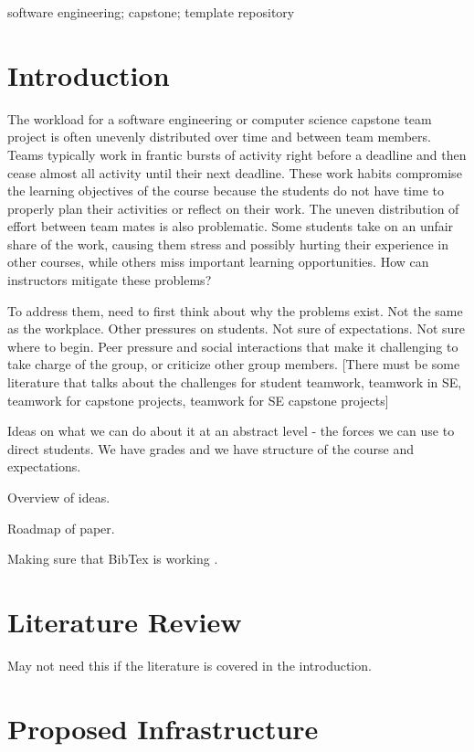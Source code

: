 \documentclass[10pt, conference]{IEEEtran}
\begin{document}
\begin{IEEEkeywords}
software engineering; capstone; template repository
\end{IEEEkeywords}

\section{Introduction} \label{SecIntro}

The workload for a software engineering or computer science capstone team
project is often unevenly distributed over time and between team members.  Teams
typically work in frantic bursts of activity right before a deadline and then
cease almost all activity until their next deadline.  These work habits
compromise the learning objectives of the course because the students do not
have time to properly plan their activities or reflect on their work.  The
uneven distribution of effort between team mates is also problematic.  Some
students take on an unfair share of the work, causing them stress and possibly
hurting their experience in other courses, while others miss important learning
opportunities.  How can instructors mitigate these problems?

To address them, need to first think about why the problems exist.  Not the same
as the workplace.  Other pressures on students.  Not sure of expectations.  Not
sure where to begin.  Peer pressure and social interactions that make it
challenging to take charge of the group, or criticize other group members.
[There must be some literature that talks about the challenges for student
teamwork, teamwork in SE, teamwork for capstone projects, teamwork for SE
capstone projects]

Ideas on what we can do about it at an abstract level - the forces we can use to
direct students.  We have grades and we have structure of the course and
expectations.

Overview of ideas.

Roadmap of paper.

Making sure that BibTex is working \cite{Smith2005}.

\section{Literature Review} \label{SecLitReview}
May not need this if the literature is covered in the introduction.

\section{Proposed Infrastructure} \label{SecInfrastruct}
\end{document}
